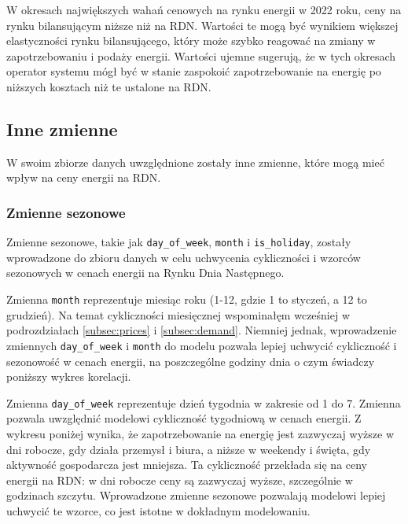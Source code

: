 W okresach największych wahań cenowych na rynku energii w 2022 roku, ceny na rynku bilansującym niższe niż na RDN. Wartości te mogą być wynikiem większej elastyczności rynku bilansującego, który może szybko reagować na zmiany w zapotrzebowaniu i podaży energii. Wartości ujemne sugerują, że w tych okresach operator systemu mógł być w stanie zaspokoić zapotrzebowanie na energię po niższych kosztach niż te ustalone na RDN.

\subsection{Inne zmienne}
\label{subsec:seasonal}

W swoim zbiorze danych uwzględnione zostały inne zmienne, które mogą mieć wpływ na ceny energii na RDN.

\subsubsection{Zmienne sezonowe}
\label{subsubsec:seasonal_variables}
Zmienne sezonowe, takie jak \texttt{day\_of\_week}, \texttt{month} i \texttt{is\_holiday}, zostały wprowadzone do zbioru danych w celu uchwycenia cykliczności i wzorców sezonowych w cenach energii na Rynku Dnia Następnego.

Zmienna \texttt{month} reprezentuje miesiąc roku (1-12, gdzie 1 to styczeń, a 12 to grudzień). Na temat cykliczności miesięcznej wspominałęm wcześniej w podrozdziałach \ref{subsec:prices} i \ref{subsec:demand}. Niemniej jednak, wprowadzenie zmiennych \texttt{day\_of\_week} i \texttt{month} do modelu pozwala lepiej uchwycić cykliczność i sezonowość w cenach energii, na poszczególne godziny dnia o czym świadczy poniższy wykres korelacji.

Zmienna \texttt{day\_of\_week} reprezentuje dzień tygodnia w zakresie od 1 do 7. Zmienna pozwala uwzględnić modelowi cykliczność tygodniową w cenach energii. Z wykresu poniżej wynika, że zapotrzebowanie na energię jest zazwyczaj wyższe w dni robocze, gdy działa przemysł i biura, a niższe w weekendy i święta, gdy aktywność gospodarcza jest mniejsza. Ta cykliczność przekłada się na ceny energii na RDN: w dni robocze ceny są zazwyczaj wyższe, szczególnie w godzinach szczytu. Wprowadzone zmienne sezonowe pozwalają modelowi lepiej uchwycić te wzorce, co jest istotne w dokładnym modelowaniu.

